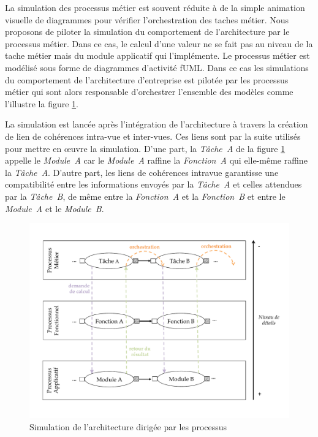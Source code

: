 La simulation des processus métier est souvent réduite à de la simple animation
visuelle de diagrammes pour vérifier l'orchestration des taches métier. Nous
proposons de piloter la simulation du comportement de l'architecture par le
processus métier. Dans ce cas, le calcul d'une valeur ne se fait pas au niveau
de la tache métier mais du module applicatif qui l'implémente. Le processus
métier est modélisé sous forme de diagrammes d'activité fUML. Dans ce cas les
simulations du comportement de l'architecture d'entreprise est pilotée par les
processus métier qui sont alors responsable d'orchestrer l'ensemble des modèles
comme l'illustre la figure \ref{fig:Simulation_Approche}. 

La simulation est
lancée après l'intégration de l'architecture à travers la création de lien de
cohérences intra-vue et inter-vues. Ces liens sont par la suite utilisés pour
mettre en œuvre la simulation. D'une part, la \textit{Tâche~A} de la figure
\ref{fig:Simulation_Approche} appelle le \textit{Module~A} car le
\textit{Module~A} raffine la \textit{Fonction~A} qui elle-même raffine la
\textit{Tâche~A}. D'autre part, les liens de cohérences intravue garantisse une
compatibilité entre les informations envoyés par la \textit{Tâche~A} et celles
attendues par la \textit{Tâche~B}, de même entre la \textit{Fonction~A} et la
\textit{Fonction~B} et entre le \textit{Module~A} et le \textit{Module~B}.

\begin{figure}[!ht]
    \begin{center}
        \includegraphics[trim= 0cm 1cm 0cm 0cm, width=1\textwidth]{figures/4_demarche/approche_simulation.pdf}
    \end{center}
    \caption{Simulation de l'architecture dirigée par les processus}
    \label{fig:Simulation_Approche}
\end{figure}

